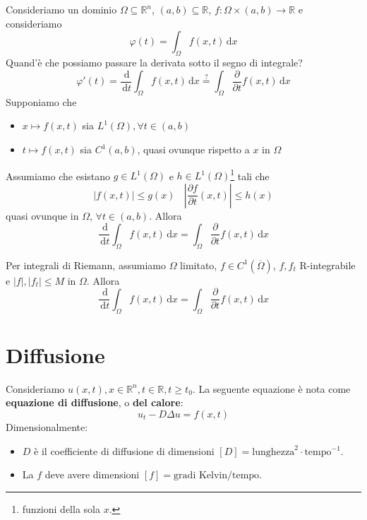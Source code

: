 \documentclass[10pt,a4paper,twoside,openright]{book}
\newcommand{\de}{\,\mathrm d}
\newcommand{\dx}{\de x}
\newcommand{\dt}{\de t}
\begin{document}
Consideriamo un dominio $\Omega \subseteq \mathbb{R}^{n}$, $(a,b) \subseteq \mathbb{R}$, $f:\Omega \times (a,b)\rightarrow \mathbb{R}$ e consideriamo
\begin{equation*}
    \varphi (t) =\int _{\Omega } f(x,t) \dx
\end{equation*}
Quand'è che possiamo passare la derivata sotto il segno di integrale?
\begin{equation*}
    \varphi '(t) =\frac{\de}{\dt}\int _{\Omega } f(x,t) \dx\overset{?}{=}\int _{\Omega }\frac{\partial }{\partial t} f(x,t) \dx
\end{equation*}
Supponiamo che
\begin{itemize}
    \item $\displaystyle x\mapsto f(x,t)$ sia $\displaystyle L^{1}(\Omega),\forall t\in (a,b)$
    \item $\displaystyle t\mapsto f(x,t)$ sia $\displaystyle C^{1}(a,b)$, quasi ovunque rispetto a $x$ in $\displaystyle \Omega $
\end{itemize}
\begin{theorem}
    Assumiamo che esistano $g\in L^{1}(\Omega)$ e $h\in L^{1}(\Omega)$\footnote{funzioni della sola $x$.} tali che
    \begin{equation*}
        | f(x,t)| \leqslant g(x) \ \ \ \ \left| \frac{\partial f}{\partial t}(x,t)\right| \leqslant h(x)
    \end{equation*}
    quasi ovunque in $\displaystyle \Omega $, $\displaystyle \forall t\in (a,b)$. Allora
    \begin{equation*}
        \frac{\de}{\dt}\int _{\Omega } f(x,t) \dx=\int _{\Omega }\frac{\partial }{\partial t} f(x,t) \dx
    \end{equation*}
\end{theorem}
Per integrali di Riemann, assumiamo $\Omega $ limitato, $f\in C^{1}(\overline{\Omega })$, $f,f_{t}$ R-integrabile e $| f|,| f_{t}| \leqslant M$ in $\Omega $. Allora
\begin{equation*}
    \frac{\de}{\dt}\int _{\Omega } f(x,t) \dx=\int _{\Omega }\frac{\partial }{\partial t} f(x,t) \dx
\end{equation*}
\chapter{Diffusione}

Consideriamo $u(x,t),x\in \mathbb{R}^{n},t\in \mathbb{R},t\geqslant t_{0}$. La seguente equazione è nota come \textbf{equazione di diffusione}, o \textbf{del calore}:
\begin{equation*}
    \boxed{u_{t} -D\Delta u=f(x,t)}
\end{equation*}
Dimensionalmente:
\begin{itemize}
    \item $D$ è il coefficiente di diffusione di dimensioni $[ D] =\text{lunghezza}^{2} \cdotp \text{tempo}^{-1}$.
    \item La $f$ deve avere dimensioni $[ f] =\text{gradi Kelvin} /\text{tempo}$.
\end{itemize}
\end{document}
